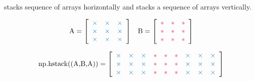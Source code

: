  stacks sequence of arrays horizontally and  stacks a sequence of arrays vertically.

\begin{align*}
\text{\li{A}} = \left[\begin{array}{ccc}
\textcolor{blue}{\times}&\textcolor{blue}{\times}&\textcolor{blue}{\times}\\
\textcolor{blue}{\times}&\textcolor{blue}{\times}&\textcolor{blue}{\times}\\
\textcolor{blue}{\times}&\textcolor{blue}{\times}&\textcolor{blue}{\times}
\end{array}\right]
&&
\text{\li{B}} = \left[\begin{array}{ccc}
\textcolor{red}{*} & \textcolor{red}{*} & \textcolor{red}{*} \\
\textcolor{red}{*} & \textcolor{red}{*} & \textcolor{red}{*} \\
\textcolor{red}{*} & \textcolor{red}{*} & \textcolor{red}{*}
\end{array}\right]
\end{align*}

\begin{align*}
\text{\li{np.hstack((A,B,A))}} =
\left[\begin{array}{ccccccccc}
\textcolor{blue}{\times}&\textcolor{blue}{\times}&\textcolor{blue}{\times}&
\textcolor{red}{*} & \textcolor{red}{*} & \textcolor{red}{*}&
\textcolor{blue}{\times}&\textcolor{blue}{\times}&\textcolor{blue}{\times}\\
\textcolor{blue}{\times}&\textcolor{blue}{\times}&\textcolor{blue}{\times}&
\textcolor{red}{*} & \textcolor{red}{*} & \textcolor{red}{*}&
\textcolor{blue}{\times}&\textcolor{blue}{\times}&\textcolor{blue}{\times}\\
\textcolor{blue}{\times}&\textcolor{blue}{\times}&\textcolor{blue}{\times}&
\textcolor{red}{*} & \textcolor{red}{*} & \textcolor{red}{*}&
\textcolor{blue}{\times}&\textcolor{blue}{\times}&\textcolor{blue}{\times}
\end{array}\right]
\end{align*}

